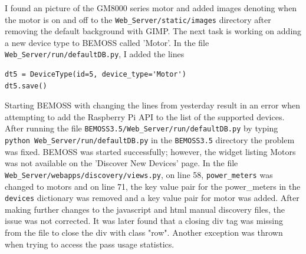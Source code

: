 \documentclass[fontsize=11pt, %
                             paper=letter, %
                             twoside, %
                             captions=tableheading,
                             index=totoc,
                             hyperref]{labbook}
\begin{document}
\begin{addmargin}[0cm]{0cm}
I found an picture of the GM$8000$ series motor and added images denoting when the motor is on and off to the \texttt{Web\_Server/static/images} directory after removing the default background with GIMP.
\bigbreak\noindent
The next task is working on adding a new device type to BEMOSS called 'Motor'. In the file \texttt{Web\_Server/run/defaultDB.py}, I added the lines
\begin{verbatim}
dt5 = DeviceType(id=5, device_type='Motor')
dt5.save()
\end{verbatim}

Starting BEMOSS with changing the lines from yesterday result in an error when attempting to add the Raspberry Pi API to the list of the supported devices. After running the file \texttt{BEMOSS3.5/Web\_Server/run/defaultDB.py} by typing \texttt{python Web\_Server/run/defaultDB.py} in the \texttt{BEMOSS3.5} directory the problem was fixed. BEMOSS was started successfully; however, the widget listing Motors was not available on the 'Discover New Devices' page. In the file \texttt{Web\_Server/webapps/discovery/views.py}, on line 58, \texttt{power\_meters} was changed to motors and on line 71, the key value pair for the power\_meters in the \texttt{devices} dictionary was removed and a key value pair for motor was added. After making further changes to the javascript and html manual discovery files, the issue was not corrected. It was later found that a closing div tag was missing from the file to close the div with class "row". Another exception was thrown when trying to access the pass usage statistics.


\end{addmargin}
\end{document}
